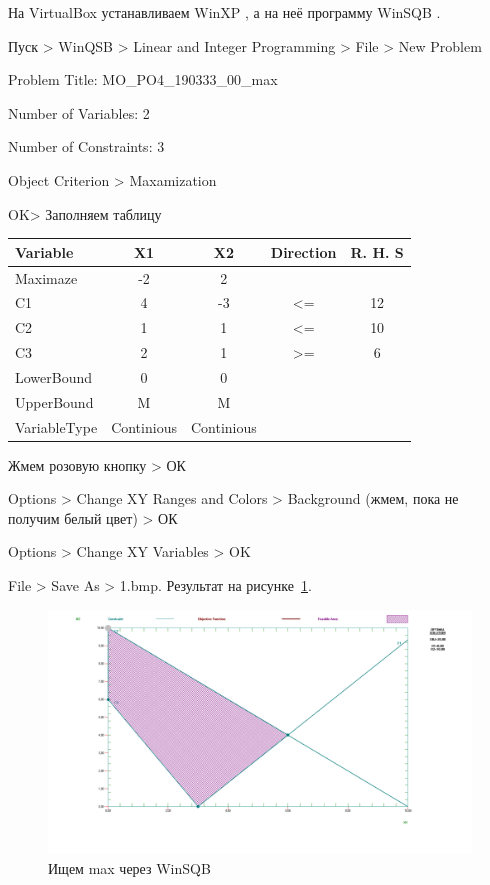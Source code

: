 На VirtualBox \cite{VirtualBox} устанавливаем WinXP \cite{WinXP}, а на неё программу WinSQB \cite{WinSQB}.

Пуск > WinQSB > Linear and Integer Programming > File > New Problem

Problem Title: MO\_PO4\_190333\_00\_max

Number of Variables: 2

Number of Constraints: 3

Object Criterion > Maxamization

OK> Заполняем таблицу

\begin{table}[h!]
  \centering
  \begin{tabular}{ |l||c|c|c|c| } 
    \hline
    Variable & X1 & X2 & Direction & R. H. S \\ \hline
    \hline
    Maximaze & -2 & 2 &  & \\ \hline
    C1 & 4 & -3 & <= & 12 \\ \hline
    C2 & 1 & 1 & <= & 10 \\ \hline
    C3 & 2 & 1 & >= & 6 \\ \hline
    LowerBound & 0 & 0 &  & \\ \hline
    UpperBound & M & M &  & \\ \hline
    VariableType & Continious & Continious &  & \\ \hline
  \end{tabular}
\end{table}

Жмем розовую кнопку > ОК

Options > Change XY Ranges and Colors > Background (жмем, пока не получим белый цвет) > ОК

Options > Change XY Variables > OK

File > Save As > 1.bmp. Результат на рисунке~\ref{fig:max}.

\begin{figure}[!htb]
  \centering

  \includegraphics[width=16cm]
  {inc/max.png}

  \caption{Ищем max через WinSQB}
  \label{fig:max}
\end{figure}

